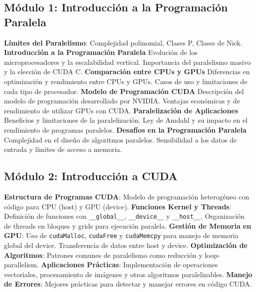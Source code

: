 \subsection{Módulo 1: Introducción a la Programación Paralela}

\textbf{Límites del Paralelismo}: Complejidad polinomial, Clases P, Clases de Nick. \textbf{Introducción a la
Programación Paralela} Evolución de los microprocesadores y la escalabilidad vertical. Importancia del paralelismo
masivo y la elección de CUDA C. \textbf{Comparación entre CPUs y GPUs} Diferencias en optimización y rendimiento entre
CPUs y GPUs. Casos de uso y limitaciones de cada tipo de procesador. \textbf{Modelo de Programación CUDA} Descripción
del modelo de programación desarrollado por NVIDIA. Ventajas económicas y de rendimiento de utilizar GPUs con CUDA.
\textbf{Paralelización de Aplicaciones} Beneficios y limitaciones de la paralelización. Ley de Amdahl y su impacto en el
rendimiento de programas paralelos. \textbf{Desafíos en la Programación Paralela} Complejidad en el diseño de algoritmos
paralelos. Sensibilidad a los datos de entrada y límites de acceso a memoria.



\subsection{Módulo 2: Introducción a CUDA}

\textbf{Estructura de Programas CUDA}: Modelo de programación heterogéneo con código para CPU (host) y GPU (device).
\textbf{Funciones Kernel y Threads}: Definición de funciones con \texttt{\_\_global\_\_}, \texttt{\_\_device\_\_} y
\texttt{\_\_host\_\_}. Organización de threads en bloques y grids para ejecución paralela. \textbf{Gestión de Memoria en
GPU}: Uso de \texttt{cudaMalloc}, \texttt{cudaFree} y \texttt{cudaMemcpy} para manejo de memoria global del device.
Transferencia de datos entre host y device. \textbf{Optimización de Algoritmos}: Patrones comunes de paralelismo como
reducción y loop-parallelism. \textbf{Aplicaciones Prácticas}: Implementación de operaciones vectoriales, procesamiento
de imágenes y otros algoritmos paralelizables. \textbf{Manejo de Errores}: Mejores prácticas para detectar y manejar
errores en código CUDA.


